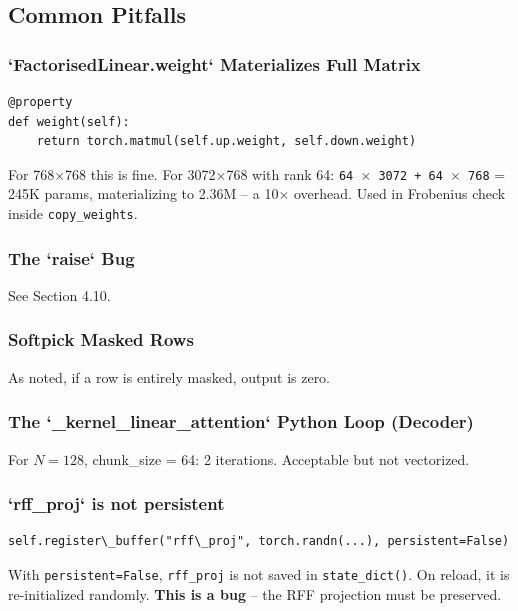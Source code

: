 \subsection{Common Pitfalls}

\subsubsection{`FactorisedLinear.weight` Materializes Full Matrix}

\begin{lstlisting}
@property
def weight(self):
    return torch.matmul(self.up.weight, self.down.weight)
\end{lstlisting}

For 768$\times$768 this is fine. For 3072$\times$768 with rank 64: \texttt{64 $\times$ 3072 + 64 $\times$ 768} 
= 245K params, materializing to 2.36M -- a 10$\times$ overhead. Used in Frobenius 
check inside \texttt{copy\_weights}.

\subsubsection{The `raise` Bug}

See Section 4.10.

\subsubsection{Softpick Masked Rows}

As noted, if a row is entirely masked, output is zero.

\subsubsection{The `\_kernel\_linear\_attention` Python Loop (Decoder)}

For $N = 128$, chunk\_size = 64: 2 iterations. Acceptable but not 
vectorized.

\subsubsection{`rff\_proj` is not persistent}

\begin{lstlisting}
self.register\_buffer("rff\_proj", torch.randn(...), persistent=False)
\end{lstlisting}

With \texttt{persistent=False}, \texttt{rff\_proj} is not saved in \texttt{state\_dict()}. On 
reload, it is re-initialized randomly. \textbf{This is a bug} -- the RFF 
projection must be preserved.

